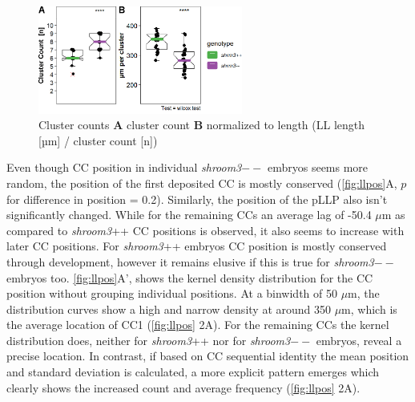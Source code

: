 \documentclass[11pt,singlespacinge,twoside]{reedthesis} %
\begin{document}
\begin{figure}

{\centering \includegraphics[width=0.6\textwidth]{figures/results/01_morphometrics/ll_counts} 

}

\caption[Cluster Counts]{Cluster counts \textbf{A} cluster count \textbf{B} normalized to length (LL length {[}µm{]} / cluster count {[}n{]})}\label{fig:llcounts}
\end{figure}
Even though CC position in individual \emph{shroom3}\(--\) embryos seems more random, the position of the first deposited CC is mostly conserved (\ref{fig:llpos}A, \(p\) for difference in position = 0.2). Similarly, the position of the pLLP also isn't significantly changed. While for the remaining CCs an average lag of -50.4 \(\mu\)m as compared to \emph{shroom3}++ CC positions is observed, it also seems to increase with later CC positions. For \emph{shroom3}++ embryos CC position is mostly conserved through development, however it remains elusive if this is true for \emph{shroom3}\(--\) embryos too.
\ref{fig:llpos}A', shows the kernel density distribution for the CC position without grouping individual positions. At a binwidth of 50 \(\mu\)m, the distribution curves show a high and narrow density at around 350 \(\mu\)m, which is the average location of CC1 (\ref{fig:llpos} 2A). For the remaining CCs the kernel distribution does, neither for \emph{shroom3}++ nor for \emph{shroom3}\(--\) embryos, reveal a precise location. In contrast, if based on CC sequential identity the mean position and standard deviation is calculated, a more explicit pattern emerges which clearly shows the increased count and average frequency (\ref{fig:llpos} 2A).
\end{document}
